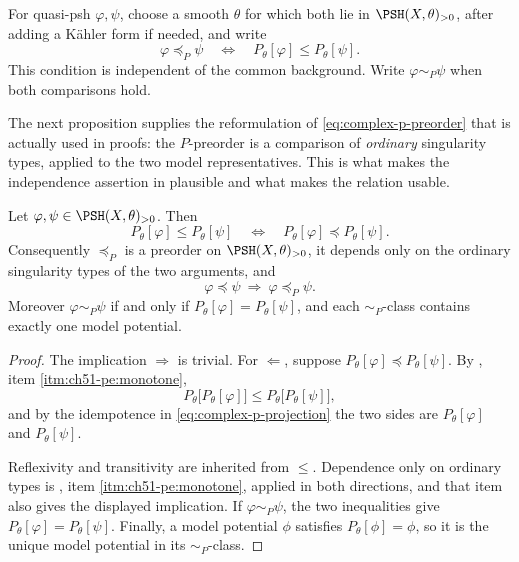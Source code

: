 \begin{definition}[\(P\)-preorder]
\label{def:complex-p-preorder}
For quasi-psh \(\varphi,\psi\), choose a smooth \(\theta\) for which both
lie in \(\PSH(X,\theta)_{>0}\), after adding a K\"ahler form if needed,
and write
\[
 \varphi\preceq_P\psi
 \quad\Longleftrightarrow\quad
 P_\theta[\varphi]\leq P_\theta[\psi].
\tag{51.26}\label{eq:complex-p-preorder}
\]
This condition is independent of the common background.  Write
\(\varphi\sim_P\psi\) when both comparisons hold.
\end{definition}

The next proposition supplies the reformulation of
\eqref{eq:complex-p-preorder} that is actually used in proofs: the
\(P\)-preorder is a comparison of \emph{ordinary} singularity types,
applied to the two model representatives.  This is what makes the
independence assertion in  plausible and
what makes the relation usable.

\begin{proposition}\label{prop:ch51-p-preorder-reformulation}
Let \(\varphi,\psi\in\PSH(X,\theta)_{>0}\).  Then
\[
 P_\theta[\varphi]\leq P_\theta[\psi]
 \quad\Longleftrightarrow\quad
 P_\theta[\varphi]\preceq P_\theta[\psi].
\]
Consequently \(\preceq_P\) is a preorder on
\(\PSH(X,\theta)_{>0}\), it depends only on the ordinary singularity
types of the two arguments, and
\[
 \varphi\preceq\psi\ \Longrightarrow\ \varphi\preceq_P\psi .
\]
Moreover \(\varphi\sim_P\psi\) if and only if
\(P_\theta[\varphi]=P_\theta[\psi]\), and each \(\sim_P\)-class contains
exactly one model potential.
\end{proposition}

\begin{proof}
The implication \(\Rightarrow\) is trivial.  For \(\Leftarrow\), suppose
\(P_\theta[\varphi]\preceq P_\theta[\psi]\).  By
, item \cref{itm:ch51-pe:monotone},
\[
 P_\theta\bigl[P_\theta[\varphi]\bigr]
 \leq
 P_\theta\bigl[P_\theta[\psi]\bigr],
\]
and by the idempotence in \eqref{eq:complex-p-projection} the two sides
are \(P_\theta[\varphi]\) and \(P_\theta[\psi]\).

Reflexivity and transitivity are inherited from \(\leq\).  Dependence
only on ordinary types is
, item \cref{itm:ch51-pe:monotone}, applied
in both directions, and that item also gives the displayed implication.
If \(\varphi\sim_P\psi\), the two inequalities give
\(P_\theta[\varphi]=P_\theta[\psi]\).  Finally, a model potential
\(\phi\) satisfies \(P_\theta[\phi]=\phi\), so it is the unique model
potential in its \(\sim_P\)-class.
\end{proof}

